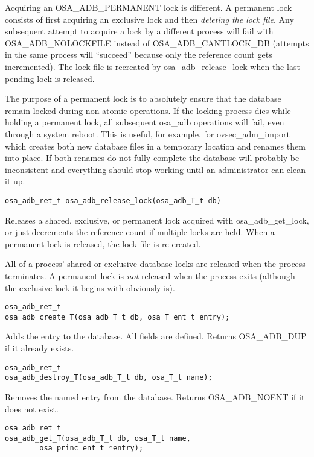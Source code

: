 Acquiring an OSA_ADB_PERMANENT lock is different.  A permanent lock
consists of first acquiring an exclusive lock and then {\it deleting
the lock file}.  Any subsequent attempt to acquire a lock by a
different process will fail with OSA_ADB_NOLOCKFILE instead of
OSA_ADB_CANTLOCK_DB (attempts in the same process will ``succeed''
because only the reference count gets incremented).  The lock file is
recreated by osa_adb_release_lock when the last pending lock is released.

The purpose of a permanent lock is to absolutely ensure that the
database remain locked during non-atomic operations.  If the locking
process dies while holding a permanent lock, all subsequent osa_adb
operations will fail, even through a system reboot.  This is useful,
for example, for ovsec_adm_import which creates both new database
files in a temporary location and renames them into place.  If both
renames do not fully complete the database will probably be
inconsistent and everything should stop working until an administrator
can clean it up.

\begin{verbatim}
osa_adb_ret_t osa_adb_release_lock(osa_adb_T_t db)
\end{verbatim}

Releases a shared, exclusive, or permanent lock acquired with
osa_adb_get_lock, or just decrements the reference count if multiple
locks are held.  When a permanent lock is released, the lock file is
re-created.

All of a process' shared or exclusive database locks are released when
the process terminates.  A permanent lock is {\it not} released when
the process exits (although the exclusive lock it begins with
obviously is).

\begin{verbatim}
osa_adb_ret_t
osa_adb_create_T(osa_adb_T_t db, osa_T_ent_t entry);
\end{verbatim}
%
Adds the entry to the database.  All fields are defined.  Returns
OSA_ADB_DUP if it already exists.

\begin{verbatim}
osa_adb_ret_t
osa_adb_destroy_T(osa_adb_T_t db, osa_T_t name);
\end{verbatim}

Removes the named entry from the database.  Returns OSA_ADB_NOENT if
it does not exist.

\begin{verbatim}
osa_adb_ret_t
osa_adb_get_T(osa_adb_T_t db, osa_T_t name,
        osa_princ_ent_t *entry); 
\end{verbatim}

